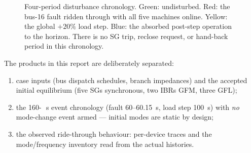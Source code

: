 \documentclass[12pt,a4paper]{article}
\newcommand{\pu}{\ifmmode\,\mathrm{p.u.}\else\ p.u.\fi}
\newcommand{\second}{\ifmmode\,\mathrm{s}\else\ s\fi}
\begin{document}
\begin{figure}[H]
\centering
{}
\caption{Four-period disturbance chronology.  Green: undisturbed.  Red: the bus-16
fault ridden through with all five machines online.  Yellow: the global $+20\%$
load step.  Blue: the absorbed post-step operation to the horizon.  There is no
SG trip, reclose request, or hand-back period in this chronology.}
\label{fig:periods}
\end{figure}

The products in this report are deliberately separated:
\begin{enumerate}
  \item case inputs (bus dispatch schedules, branch impedances) and the accepted
        initial equilibrium (five SGs synchronous, two IBRs GFM, three GFL);
  \item the 160-\second{} event chronology (fault 60--60.15~s, load step 100~s)
        with \emph{no} mode-change event armed --- initial modes are static by design;
  \item the observed ride-through behaviour: per-device traces and the
        mode/frequency inventory read from the actual histories.
\end{enumerate}
\end{document}

